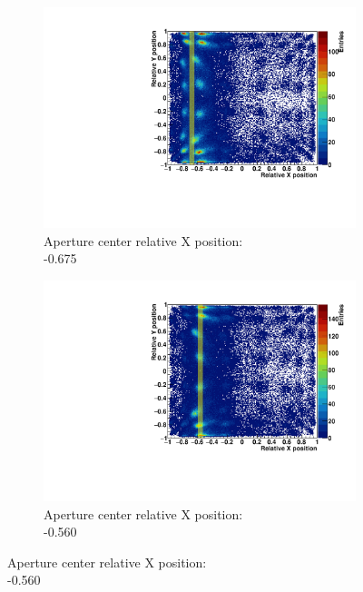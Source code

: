\begin{figure}
\begin{subfigure}[t]{0.5\textwidth}
\centering
\includegraphics[width=\textwidth]{03_GraphicFiles/chapter3_CLaRySproto/Absorber/images_scan/line_2mm/run8_floodMap.pdf}
\caption{Aperture center relative X position: \\ -0.675}
\label{chap3::fig::scan_map1}
\end{subfigure}
\begin{subfigure}[t]{0.5\textwidth}
\centering
\includegraphics[width=\textwidth]{03_GraphicFiles/chapter3_CLaRySproto/Absorber/images_scan/line_2mm/run9_floodMap.pdf}
\caption{Aperture center relative X position: \\ -0.560}
\label{chap3::fig::scan_map2}
\end{subfigure}\newline

\end{figure}
